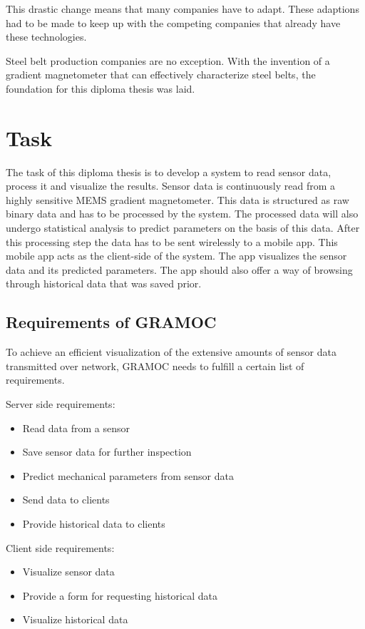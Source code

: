 This drastic change means that many companies have to adapt. These adaptions had to be made to keep up with the competing companies that already have these technologies.

Steel belt production companies are no exception. With the invention of a gradient magnetometer that can effectively characterize steel belts, the foundation for this diploma thesis was laid.


\section{Task}

The task of this diploma thesis is to develop a system to read sensor data, process it and visualize the results. Sensor data is continuously read from a highly sensitive MEMS gradient magnetometer. This data is structured as raw binary data and has to be processed by the system. The processed data will also undergo statistical analysis to predict parameters on the basis of this data. After this processing step the data has to be sent wirelessly to a mobile app. This mobile app acts as the client-side of the system. The app visualizes the sensor data and its predicted parameters. The app should also offer a way of browsing through historical data that was saved prior.

\subsection{Requirements of GRAMOC}
To achieve an efficient visualization of the extensive amounts of sensor data transmitted over network, GRAMOC needs to fulfill a certain list of requirements.

Server side requirements:

\begin{itemize}
    \item Read data from a sensor
    \item Save sensor data for further inspection
    \item Predict mechanical parameters from sensor data
    \item Send data to clients
    \item Provide historical data to clients
\end{itemize}

Client side requirements:

\begin{itemize}
    \item Visualize sensor data
    \item Provide a form for requesting historical data
    \item Visualize historical data
\end{itemize}

